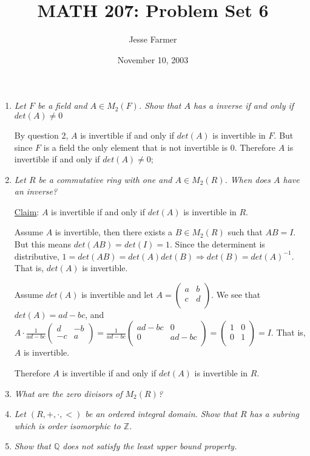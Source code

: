 \documentclass[11pt]{article}
\title{MATH 207: Problem Set 6}
\author{Jesse Farmer}
\date{November 10, 2003}
\begin{document}
\maketitle
\begin{enumerate}
\item \emph{Let $F$ be a field and $A \in M_2(F)$.  Show that $A$ has a inverse if and only if $det(A) \neq 0$}

By question 2, $A$ is invertible if and only if $det(A)$ is invertible in $F$.  But since $F$ is a field the only element that is not invertible is $0$.  Therefore $A$ is invertible if and only if $det(A) \neq 0$;

\item \emph{Let $R$ be a commutative ring with one and $A \in M_2(R)$.  When does $A$ have an inverse?}

\underline{Claim}: $A$ is invertible if and only if $det(A)$ is invertible in $R$.

Assume $A$ is invertible, then there exists a $B \in M_2(R)$ such that $AB=I$.  But this means $det(AB)=det(I)=1$.
Since the determinent is distributive, $1 = det(AB) = det(A)det(B) \Rightarrow det(B)=det(A)^{-1}$.  That is, $det(A)$ is invertible.

Assume $det(A)$ is invertible and let 
$A=\left( \begin{array}{cc} a & b \\ c & d \\ \end{array} \right)$.  
We see that $det(A)=ad-bc$, and $A\cdot\frac{1}{ad-bc}
\left( \begin{array}{rr} d & -b \\ -c & a \\  \end{array} \right) = 
\frac{1}{ad-bc}\left( \begin{array}{cc} ad-bc & 0 \\ 0 & ad-bc \\  \end{array} \right) =
\left( \begin{array}{cc} 1 & 0 \\ 0 & 1 \\  \end{array} \right) = I$.  That is, $A$ is invertible.

Therefore $A$ is invertible if and only if $det(A)$ is invertible in $R$.
\item \emph{What are the zero divisors of $M_2(R)$?}
\item \emph{Let $(R,+,\cdot,<)$ be an ordered integral domain.  Show that $R$ has a subring which is order isomorphic to $\mathbb{Z}$.}
\item \emph{Show that $\mathbb{Q}$ does not satisfy the least upper bound property.}


\end{enumerate}
\end{document}

